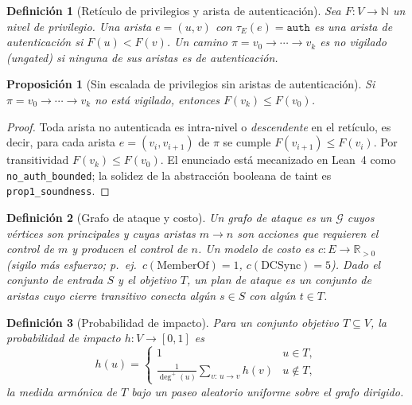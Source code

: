 \documentclass[journal]{IEEEtran}
\newcommand{\R}{\mathbb{R}}
\newcommand{\N}{\mathbb{N}}
\newcommand{\IR}{\mathcal{G}}
\newtheorem{definition}{Definición}
\newtheorem{proposition}{Proposición}
\begin{document}
\begin{definition}[Retículo de privilegios y arista de autenticación]
\label{def:auth}
Sea $F:V\to\N$ un nivel de privilegio. Una arista $e=(u,v)$ con
$\tau_E(e)=\texttt{auth}$ es una \emph{arista de autenticación} si $F(u)<F(v)$. Un
camino $\pi=v_0\to\cdots\to v_k$ es \emph{no vigilado} (ungated) si ninguna de sus
aristas es de autenticación.
\end{definition}

\begin{proposition}[Sin escalada de privilegios sin aristas de autenticación]
\label{prop:auth}
Si $\pi=v_0\to\cdots\to v_k$ no está vigilado, entonces $F(v_k)\le F(v_0)$.
\end{proposition}
\begin{proof}
Toda arista no autenticada es intra-nivel o \emph{descendente} en el retículo, es
decir, para cada arista $e=(v_i,v_{i+1})$ de $\pi$ se cumple $F(v_{i+1})\le
F(v_i)$. Por transitividad $F(v_k)\le F(v_0)$. El enunciado está mecanizado en
Lean~4 como \texttt{no\_auth\_bounded}; la solidez de la abstracción booleana de
taint es \texttt{prop1\_soundness}. \qedhere
\end{proof}

\begin{definition}[Grafo de ataque y costo]
\label{def:cost}
Un \emph{grafo de ataque} es un $\IR$ cuyos vértices son principales y cuyas
aristas $m\to n$ son \emph{acciones} que requieren el control de $m$ y producen el
control de $n$. Un \emph{modelo de costo} es $c:E\to\R_{>0}$ (sigilo más esfuerzo;
p.\ ej.\ $c(\mathrm{MemberOf})=1$, $c(\mathrm{DCSync})=5$). Dado el conjunto de
entrada $S$ y el objetivo $T$, un \emph{plan de ataque} es un conjunto de aristas
cuyo cierre transitivo conecta algún $s\in S$ con algún $t\in T$.
\end{definition}

\begin{definition}[Probabilidad de impacto]
\label{def:hit}
Para un conjunto objetivo $T\subseteq V$, la \emph{probabilidad de impacto}
$h:V\to[0,1]$ es
\[
h(u)=
\begin{cases}
1 & u\in T,\\
\frac{1}{\deg^{+}(u)}\sum_{v:\,u\to v}h(v) & u\notin T,
\end{cases}
\]
la medida armónica de $T$ bajo un paseo aleatorio uniforme sobre el grafo
dirigido.
\end{definition}
\end{document}
